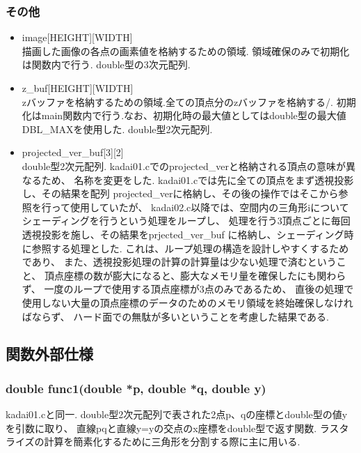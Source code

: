 \documentclass[a4j,dvipdfmx]{jsarticle}
\begin{document}
\subsubsection{その他}
\begin{itemize}
\item image[HEIGHT][WIDTH]\\
  描画した画像の各点の画素値を格納するための領域.
  領域確保のみで初期化は関数内で行う.
  double型の3次元配列.

\item z\_buf[HEIGHT][WIDTH]\\
  zバッファを格納するための領域.全ての頂点分のzバッファを格納する/.
  初期化はmain関数内で行う.なお、初期化時の最大値としてはdouble型の最大値
  DBL\_MAXを使用した.
  double型2次元配列.
  
\item projected\_ver\_buf[3][2]\\
  double型2次元配列.
  kadai01.cでのprojected\_verと格納される頂点の意味が異なるため、
  名称を変更をした.
  kadai01.cでは先に全ての頂点をまず透視投影し、その結果を配列
  projected\_verに格納し、その後の操作ではそこから参照を行って使用していたが、
  kadai02.c以降では、空間内の三角形iについてシェーディングを行うという処理をループし、
  処理を行う3頂点ごとに毎回透視投影を施し、その結果をprjected\_ver\_buf
  に格納し、シェーディング時に参照する処理とした.
  これは、ループ処理の構造を設計しやすくするためであり、
  また、透視投影処理の計算の計算量は少ない処理で済むということ、
  頂点座標の数が膨大になると、膨大なメモリ量を確保したにも関わらず、
  一度のループで使用する頂点座標が3点のみであるため、
  直後の処理で使用しない大量の頂点座標のデータのためのメモリ領域を終始確保しなければならず、
  ハード面での無駄が多いということを考慮した結果である.
\end{itemize}


\subsection{関数外部仕様}
\subsubsection{double func1(double *p, double *q, double y)}
kadai01.cと同一.
double型2次元配列で表された2点p、qの座標とdouble型の値yを引数に取り、
直線pqと直線y=yの交点のx座標をdouble型で返す関数.
ラスタライズの計算を簡素化するために三角形を分割する際に主に用いる.
\end{document}
